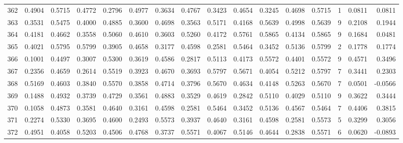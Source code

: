 \begin{tabular}{lrrrrrrrrrrrrrrr}
362 &      0.4904 &  0.5715 &  0.4772 &  0.2796 &  0.4977 &  0.3634 &  0.4767 &  0.3423 &  0.4654 &  0.3245 &   0.4698 &     0.5715 &      1 &                    0.0811 &                     0.0811 \\
363 &      0.3531 &  0.5475 &  0.4000 &  0.4885 &  0.3600 &  0.4698 &  0.3563 &  0.5171 &  0.4168 &  0.5639 &   0.4998 &     0.5639 &      9 &                    0.2108 &                     0.1944 \\
364 &      0.4181 &  0.4662 &  0.3558 &  0.5060 &  0.4610 &  0.3603 &  0.5260 &  0.4172 &  0.5761 &  0.5865 &   0.4134 &     0.5865 &      9 &                    0.1684 &                     0.0481 \\
365 &      0.4021 &  0.5795 &  0.5799 &  0.3905 &  0.4658 &  0.3177 &  0.4598 &  0.2581 &  0.5464 &  0.3452 &   0.5136 &     0.5799 &      2 &                    0.1778 &                     0.1774 \\
366 &      0.1001 &  0.4497 &  0.3007 &  0.5300 &  0.3619 &  0.4586 &  0.2817 &  0.5113 &  0.4173 &  0.5572 &   0.4401 &     0.5572 &      9 &                    0.4571 &                     0.3496 \\
367 &      0.2356 &  0.4659 &  0.2614 &  0.5519 &  0.3923 &  0.4670 &  0.3693 &  0.5797 &  0.5671 &  0.4054 &   0.5212 &     0.5797 &      7 &                    0.3441 &                     0.2303 \\
368 &      0.5169 &  0.4603 &  0.3840 &  0.5570 &  0.3858 &  0.4714 &  0.3796 &  0.5670 &  0.4634 &  0.4148 &   0.5263 &     0.5670 &      7 &                    0.0501 &                    -0.0566 \\
369 &      0.1488 &  0.4932 &  0.3739 &  0.4729 &  0.3561 &  0.4883 &  0.3529 &  0.4619 &  0.2842 &  0.5110 &   0.4029 &     0.5110 &      9 &                    0.3622 &                     0.3444 \\
370 &      0.1058 &  0.4873 &  0.3581 &  0.4640 &  0.3161 &  0.4598 &  0.2581 &  0.5464 &  0.3452 &  0.5136 &   0.4567 &     0.5464 &      7 &                    0.4406 &                     0.3815 \\
371 &      0.2274 &  0.5330 &  0.3695 &  0.4600 &  0.2493 &  0.5573 &  0.3937 &  0.4640 &  0.3161 &  0.4598 &   0.2581 &     0.5573 &      5 &                    0.3299 &                     0.3056 \\
372 &      0.4951 &  0.4058 &  0.5203 &  0.4506 &  0.4768 &  0.3737 &  0.5571 &  0.4067 &  0.5146 &  0.4644 &   0.2838 &     0.5571 &      6 &                    0.0620 &                    -0.0893 \\

\end{tabular}

